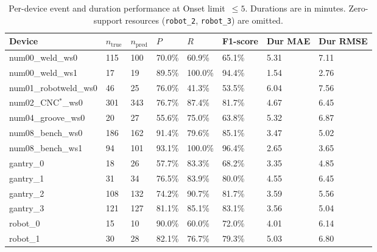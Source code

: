 \begin{table}[!tbp]
\centering
\footnotesize
\setlength{\tabcolsep}{3pt}
\renewcommand{\arraystretch}{1.12}
\caption{Per-device event and duration performance at Onset limit~$\leq5$. Durations are in minutes. Zero-support resources (\texttt{robot\_2}, \texttt{robot\_3}) are omitted.}
\label{tab:complete-6-1}
\begin{tabularx}{\textwidth}{@{}lXXXXXXX@{}}
\toprule
Device & $n_{\mathrm{true}}$ & $n_{\mathrm{pred}}$ & $P$ & $R$ & F1-score & Dur MAE & Dur RMSE \\
\midrule
num00\_weld\_ws0 & 115 & 100 & 70.0\% & 60.9\% & 65.1\% & 5.31 & 7.11 \\
num00\_weld\_ws1 & 17 & 19 & 89.5\% & 100.0\% & 94.4\% & 1.54 & 2.76 \\
num01\_robotweld\_ws0 & 46 & 25 & 76.0\% & 41.3\% & 53.5\% & 6.04 & 7.56 \\
num02\_CNC$^\ast$\_ws0 & 301 & 343 & 76.7\% & 87.4\% & 81.7\% & 4.67 & 6.45 \\
num04\_groove\_ws0 & 20 & 27 & 55.6\% & 75.0\% & 63.8\% & 5.32 & 6.87 \\
num08\_bench\_ws0 & 186 & 162 & 91.4\% & 79.6\% & 85.1\% & 3.47 & 5.02 \\
num08\_bench\_ws1 & 94 & 101 & 93.1\% & 100.0\% & 96.4\% & 2.65 & 3.65 \\
gantry\_0 & 18 & 26 & 57.7\% & 83.3\% & 68.2\% & 3.35 & 4.85 \\
gantry\_1 & 31 & 34 & 76.5\% & 83.9\% & 80.0\% & 4.55 & 6.45 \\
gantry\_2 & 108 & 132 & 74.2\% & 90.7\% & 81.7\% & 3.59 & 5.56 \\
gantry\_3 & 121 & 127 & 81.1\% & 85.1\% & 83.1\% & 3.56 & 5.04 \\
robot\_0 & 15 & 10 & 90.0\% & 60.0\% & 72.0\% & 4.01 & 6.14 \\
robot\_1 & 30 & 28 & 82.1\% & 76.7\% & 79.3\% & 5.03 & 6.80 \\
\bottomrule
\end{tabularx}
\end{table}
